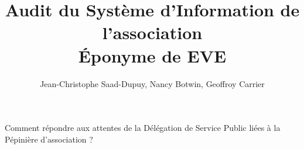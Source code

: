 \documentclass[a4wide,10pt,2pages]{article}
\title{Audit du Système d'Information de l'association \\ \Huge{Éponyme de EVE}}
\author{Jean-Christophe Saad-Dupuy, Nancy Botwin, Geoffroy Carrier}
\begin{document}
\maketitle

\tableofcontents


Comment répondre aux attentes de la Délégation de Service Public liées à la Pépinière d'association ?





\appendix

\end{document}

